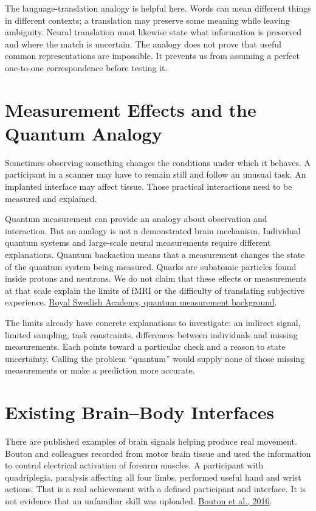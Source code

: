 The language-translation analogy is helpful here. Words can mean different things in different contexts; a translation may preserve some meaning while leaving ambiguity. Neural translation must likewise state what information is preserved and where the match is uncertain. The analogy does not prove that useful common representations are impossible. It prevents us from assuming a perfect one-to-one correspondence before testing it.\par

\section{Measurement Effects and the Quantum Analogy}

Sometimes observing something changes the conditions under which it behaves. A participant in a scanner may have to remain still and follow an unusual task. An implanted interface may affect tissue. Those practical interactions need to be measured and explained.\par

Quantum measurement can provide an analogy about observation and interaction. But an analogy is not a demonstrated brain mechanism. Individual quantum systems and large-scale neural measurements require different explanations. Quantum backaction means that a measurement changes the state of the quantum system being measured. Quarks are subatomic particles found inside protons and neutrons. We do not claim that these effects or measurements at that scale explain the limits of fMRI or the difficulty of translating subjective experience. \href{https://www.nobelprize.org/uploads/2018/06/advanced-physicsprize2012-1.pdf}{Royal Swedish Academy, quantum measurement background}.\par

The limits already have concrete explanations to investigate: an indirect signal, limited sampling, task constraints, differences between individuals and missing measurements. Each points toward a particular check and a reason to state uncertainty. Calling the problem ``quantum'' would supply none of those missing measurements or make a prediction more accurate.\par

\section{Existing Brain--Body Interfaces}

There are published examples of brain signals helping produce real movement. Bouton and colleagues recorded from motor brain tissue and used the information to control electrical activation of forearm muscles. A participant with quadriplegia, paralysis affecting all four limbs, performed useful hand and wrist actions. That is a real achievement with a defined participant and interface. It is not evidence that an unfamiliar skill was uploaded. \href{https://www.nature.com/articles/nature17435}{Bouton et al., 2016}.\par

